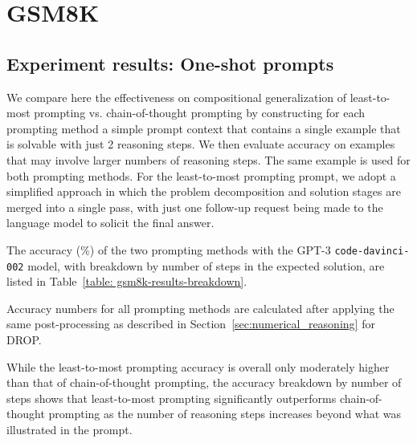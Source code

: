 \section{GSM8K}
\label{app:gsm8k}

\subsection{Experiment results: One-shot prompts}
\label{app:gsm8k-results-one-shot}

We compare here the effectiveness on compositional generalization of least-to-most prompting vs. chain-of-thought prompting by constructing for each prompting method a simple prompt context that contains a single example that is solvable with just 2 reasoning steps. We then evaluate accuracy on examples that may involve larger numbers of reasoning steps. The same example is used for both prompting methods. For the least-to-most prompting prompt, we adopt a simplified approach in which the problem decomposition and solution stages are merged into a single pass, with just one follow-up request being made to the language model to solicit the final answer.

The accuracy (\%) of the two prompting methods with the GPT-3 \texttt{code-davinci-002} model, with breakdown by number of steps in the expected solution, are listed in Table~\ref{table: gsm8k-results-breakdown}.

Accuracy numbers for all prompting methods are calculated after applying the same post-processing as described in Section~\ref{sec:numerical_reasoning} for DROP.

While the least-to-most prompting accuracy is overall only moderately higher than that of chain-of-thought prompting, the accuracy breakdown by number of steps shows that least-to-most prompting significantly outperforms chain-of-thought prompting as the number of reasoning steps increases beyond what was illustrated in the prompt.

